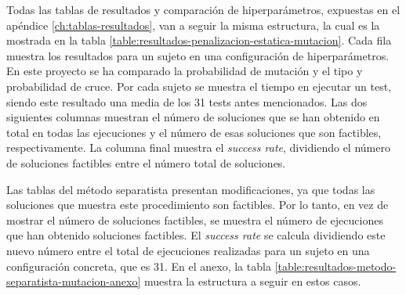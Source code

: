 Todas las tablas de resultados y comparación de hiperparámetros, expuestas en el apéndice \ref{ch:tablas-resultados}, van a seguir la misma estructura, la cual es la mostrada en la tabla \ref{table:resultados-penalizacion-estatica-mutacion}. Cada fila muestra los resultados para un sujeto en una configuración de hiperparámetros. En este proyecto se ha comparado la probabilidad de mutación y el tipo y probabilidad de cruce. Por cada sujeto se muestra el tiempo en ejecutar un test, siendo este resultado una media de los 31 tests antes mencionados. Las dos siguientes columnas muestran el número de soluciones que se han obtenido en total en todas las ejecuciones y el número de esas soluciones que son factibles, respectivamente. La columna final muestra el \textit{success rate}, dividiendo el número de soluciones factibles entre el número total de soluciones.

Las tablas del método separatista presentan modificaciones, ya que todas las soluciones que muestra este procedimiento son factibles. Por lo tanto, en vez de mostrar el número de soluciones factibles, se muestra el número de ejecuciones que han obtenido soluciones factibles. El \textit{success rate} se calcula dividiendo este nuevo número entre el total de ejecuciones realizadas para un sujeto en una configuración concreta, que es 31. En el anexo, la tabla \ref{table:resultados-metodo-separatista-mutacion-anexo} muestra la estructura a seguir en estos casos.

